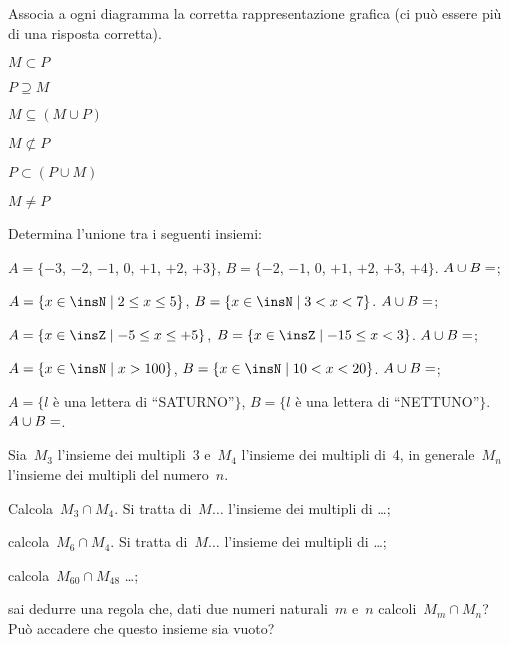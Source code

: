 \begin{esercizio}
Associa a ogni diagramma la corretta rappresentazione grafica (ci può essere più di una risposta corretta).

\TabPositions{5cm}
\begin{enumeratea}
 \item $M\subset P$ \tab\boxA\quad\boxB\quad\boxC\quad\boxD\quad\boxE
\item $P\supseteq M$ \tab\boxA\quad\boxB\quad\boxC\quad\boxD\quad\boxE
\item $M\subseteq (M\cup P)$ \tab\boxA\quad\boxB\quad\boxC\quad\boxD\quad\boxE
\item $M\not\subset P$ \tab\boxA\quad\boxB\quad\boxC\quad\boxD\quad\boxE
\item $P\subset (P\cup M)$ \tab\boxA\quad\boxB\quad\boxC\quad\boxD\quad\boxE
\item $M\neq P$ \tab\boxA\quad\boxB\quad\boxC\quad\boxD\quad\boxE
\end{enumeratea}
\begin{center}

\end{center}
\end{esercizio}
\begin{esercizio}
Determina l'unione tra i seguenti insiemi:

\begin{enumeratea}
 \item $A=\{-3$, $-2$, $-1$, $0$, $+1$, $+2$, $+3\}$, $B=\{-2$, $-1$, $0$, $+1$, $+2$, $+3$, $+4\}$. $A\cup B=\dotfill$;
 \item $A=\{x\in\insN\mid 2\le x\le 5\}$, $B=\{x\in\insN\mid 3<x<7\}$. $A\cup B=\dotfill$;
 \item $A=\{x\in\insZ\mid -5\le x\le +5\}$, $B=\{x\in\insZ\mid -15\le x<3\}$. $A\cup B=\dotfill$;
 \item $A=\{x\in\insN\mid x>100\}$, $B=\{x\in\insN\mid 10<x<20\}$. $A\cup B=\dotfill$;
 \item $A=\{l$ è una lettera di ``SATURNO''$\}$, $B=\{l$ è una lettera di ``NETTUNO''$\}$. $A\cup B=\dotfill$.
\end{enumeratea}
\end{esercizio}

\begin{esercizio}
Sia~$M_{3}$ l'insieme dei multipli~3 e~$M_{4}$ l'insieme dei multipli di~4, in
generale~$M_{n}$ l'insieme dei multipli del numero~$n$.

 \begin{enumeratea}
 \item Calcola~$M_{3}\cap M_{4}$. Si tratta di~$M\ldots$ l'insieme dei multipli di \ldots;
 \item calcola~$M_{6}\cap M_{4}$. Si tratta di~$M\ldots$ l'insieme dei multipli di \ldots;
 \item calcola~$M_{60}\cap M_{48}$ \ldots;
 \item sai dedurre una regola che, dati due numeri naturali~$m$ e~$n$ calcoli~$M_{m}\cap M_{n}$? Può accadere che questo insieme sia vuoto?
 \end{enumeratea}
\end{esercizio}


